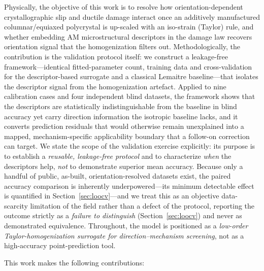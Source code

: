 \documentclass[12pt,a4paper,twocolumn]{article}
\begin{document}
Physically, the objective of this work is to resolve how orientation-dependent crystallographic slip and ductile damage interact once an additively manufactured columnar/equiaxed polycrystal is up-scaled with an iso-strain (Taylor) rule, and whether embedding AM microstructural descriptors in the damage law recovers orientation signal that the homogenization filters out. Methodologically, the contribution is the validation protocol itself: we construct a leakage-free framework---identical fitted-parameter count, training data and cross-validation for the descriptor-based surrogate and a classical Lemaitre baseline---that isolates the descriptor signal from the homogenization artefact. Applied to nine calibration cases and four independent blind datasets, the framework shows that the descriptors are statistically indistinguishable from the baseline in blind accuracy yet carry direction information the isotropic baseline lacks, and it converts prediction residuals that would otherwise remain unexplained into a mapped, mechanism-specific applicability boundary that a follow-on correction can target. We state the scope of the validation exercise explicitly: its purpose is to establish a \emph{reusable, leakage-free protocol} and to characterize \emph{when} the descriptors help, \emph{not} to demonstrate superior mean accuracy. Because only a handful of public, as-built, orientation-resolved datasets exist, the paired accuracy comparison is inherently underpowered---its minimum detectable effect is quantified in Section~\ref{sec:loocv}---and we treat this as an objective data-scarcity limitation of the field rather than a defect of the protocol, reporting the outcome strictly as a \emph{failure to distinguish} (Section~\ref{sec:loocv}) and never as demonstrated equivalence. Throughout, the model is positioned as a \emph{low-order Taylor-homogenization surrogate for direction--mechanism screening}, not as a high-accuracy point-prediction tool.

This work makes the following contributions:
\end{document}
